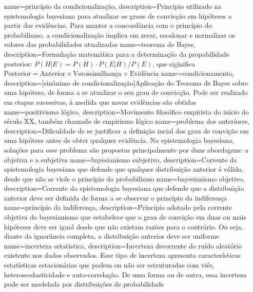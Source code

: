 {
    name=princípio da condicionalização,
    description={Princípio utilizado na epistemologia bayesiana para atualizar os graus de convicção em hipóteses a partir das evidências. Para manter a concordância com o princípio do probabilismo, a condicionalização implica em zerar, escalonar e normalizar os valores das probabilidades atualizadas}
}
{
    name=teorema de Bayes,
    description={Formulação matemática para a determinação da propabilidade posterior: $P(H | E) = P(H) \cdot P(E | H) / P(E)$, que siginifica $\text{Posterior} = \text{Anterior} \times \text{Verossimilhança} \div \text{Evidência}$}
}
{
    name=condicionamento,
    description={[sinônimo de condicionalização]Aplicação do Teorema de Bayes sobre uma hipótese, de forma a se atualizar o seu grau de convicção. Pode ser realizado em etapas sucessivas, à medida que novas evidências são obtidas}
}
{
    name=positivismo lógico,
    description={Movimento filosófico empirista do início do século XX, também chamado de empirismo lógico}
}
{
    name=problema dos anteriores,
    description={Dificuldade de se justificar a definição incial dos grau de convição em uma hipótese antes de obter qualquer evidência. Na epistemologia bayesiana, soluções para esse problema são propostas principalmente por duas abordagens: a objetiva e a subjetiva}
}
{
    name=bayesianismo subjetivo,
    description={Corrente da epistemologia bayesiana que defende que qualquer distribuição anterior é válida, desde que não se viole o princípio do probabilismo}
}
{
    name=bayesianismo objetivo,
    description={Corrente da epistemologia bayesiana que defende que a distribuição anterior deve ser definida de forma a se observar o princípio da indiferença}
}
{
    name=princípio da indiferença,
    description={Princípio adotado pela corrente objetiva do bayesianismo que estabelece que o grau de convição em duas ou mais hipóteses deve ser igual desde que não existam razões para o contrário. Ou seja, diante da ignorância completa, a distribuição anterior deve ser uniforme}
}
{
    name=incerteza estatística,
    description={Incerteza decorrente do ruído aleatório existente nos dados observados. Esse tipo de incerteza apresenta características estatísticas estacionárias que podem ou não ser estruturadas com viés, heteroscedasticidade e auto-correlação. De uma forma ou de outra, essa incerteza pode ser modelada por distribuições de probabilidade}
}
